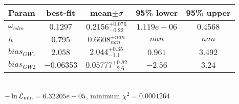 \begin{tabular}{|l|c|c|c|c|} 
 \hline 
Param & best-fit & mean$\pm\sigma$ & 95\% lower & 95\% upper \\ \hline 
$\omega_{cdm }$ &$0.1297$ & $0.2156_{-0.22}^{+0.076}$ & $1.119e-06$ & $0.4568$ \\ 
$h$ &$0.795$ & $0.6608_{nan}^{+nan}$ & $nan$ & $nan$ \\ 
$bias_{GW 1 }$ &$2.058$ & $2.044_{-1.1}^{+0.35}$ & $0.961$ & $3.492$ \\ 
$bias_{GW 2 }$ &$-0.06353$ & $0.05777_{-2.6}^{+0.82}$ & $-2.56$ & $3.24$ \\ 
\hline 
 \end{tabular} \\ 
$-\ln{\cal L}_\mathrm{min} =6.32205e-05$, minimum $\chi^2=0.0001264$ \\ 
